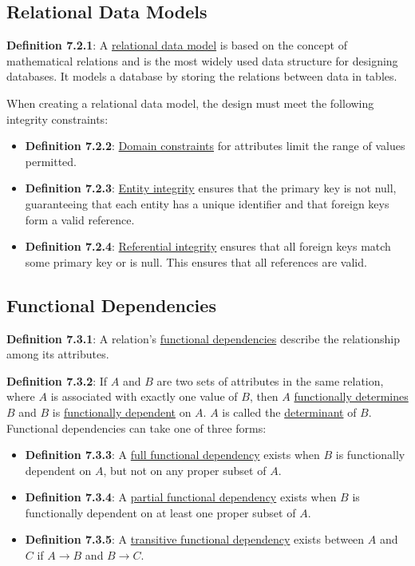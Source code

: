 \documentclass{article}
\newcommand{\separate}[1] {\vspace{#1 pt}\noindent}
\newcommand{\definition}[2]{\textbf{Definition #1}: #2\label{def:#1}}
\begin{document}
\subsection{Relational Data Models}

\definition{7.2.1}{A \underline{relational data model} is based on the concept of mathematical relations and is the most widely used data structure for designing databases. It models a database by storing the relations between data in tables.}

\separate{7}When creating a relational data model, the design must meet the following integrity constraints:
\begin{itemize}
    \item \definition{7.2.2}{\underline{Domain constraints} for attributes limit the range of values permitted.}
    \item \definition{7.2.3}{\underline{Entity integrity} ensures that the primary key is not null, guaranteeing that each entity has a unique identifier and that foreign keys form a valid reference.}
    \item \definition{7.2.4}{\underline{Referential integrity} ensures that all foreign keys match some primary key or is null. This ensures that all references are valid.}
\end{itemize}

\subsection{Functional Dependencies}

\definition{7.3.1}{A relation's \underline{functional dependencies} describe the relationship among its attributes.}

\separate{7}\definition{7.3.2}{If \(A\) and \(B\) are two sets of attributes in the same relation, where \(A\) is associated with exactly one value of \(B\), then \(A\) \underline{functionally determines} \(B\) and \(B\) is \underline{functionally dependent} on \(A\). \(A\) is called the \underline{determinant} of \(B\). Functional dependencies can take one of three forms:}
\begin{itemize}
    \item \definition{7.3.3}{A \underline{full functional dependency} exists when \(B\) is functionally dependent on \(A\), but not on any proper subset of \(A\).}
    \item \definition{7.3.4}{A \underline{partial functional dependency} exists when \(B\) is functionally dependent on at least one proper subset of \(A\).}
    \item \definition{7.3.5}{A \underline{transitive functional dependency} exists between \(A\) and \(C\) if \(A \rightarrow B\) and \(B \rightarrow C\).}
\end{itemize}
\end{document}
